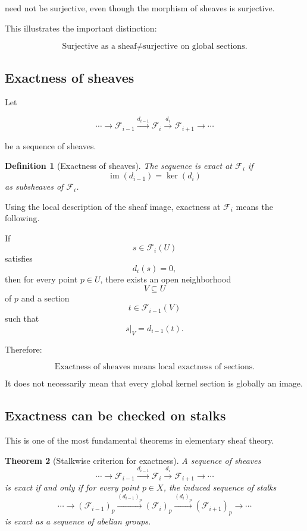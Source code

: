 \documentclass[12pt,a4paper]{article}
\DeclareMathOperator{\im}{im}
\theoremstyle{notespace}
\newtheorem{definition}{Definition}[subsection]
\newtheorem{theorem}[definition]{Theorem}
\begin{document}
need not be surjective, even though the morphism of sheaves is surjective.

This illustrates the important distinction:

\[
\boxed{
	\text{Surjective as a sheaf}
	\neq
	\text{surjective on global sections.}
}
\]

\subsection{Exactness of sheaves}
Let

\[
\cdots
\longrightarrow
\mathcal F_{i-1}
\xrightarrow{d_{i-1}}
\mathcal F_i
\xrightarrow{d_i}
\mathcal F_{i+1}
\longrightarrow
\cdots
\]

be a sequence of sheaves.

\begin{definition}[Exactness of sheaves]
	The sequence is exact at $\mathcal F_i$ if
	\[
	\im(d_{i-1})=\ker(d_i)
	\]
	as subsheaves of $\mathcal F_i$.
\end{definition}

Using the local description of the sheaf image, exactness at $\mathcal F_i$
means the following.

If
\[
s \in \mathcal F_i(U)
\]
satisfies
\[
d_i(s)=0,
\]
then for every point $p \in U$, there exists an open neighborhood
\[
V \subseteq U
\]
of $p$ and a section
\[
t \in \mathcal F_{i-1}(V)
\]
such that
\[
s|_V=d_{i-1}(t).
\]

Therefore:

\[
\boxed{
	\text{Exactness of sheaves means local exactness of sections.}
}
\]

It does not necessarily mean that every global kernel section is globally an
image.

\subsection{Exactness can be checked on stalks}
This is one of the most fundamental theorems in elementary sheaf theory.

\begin{theorem}[Stalkwise criterion for exactness]
	A sequence of sheaves
	\[
	\cdots
	\longrightarrow
	\mathcal F_{i-1}
	\xrightarrow{d_{i-1}}
	\mathcal F_i
	\xrightarrow{d_i}
	\mathcal F_{i+1}
	\longrightarrow
	\cdots
	\]
	is exact if and only if for every point $p \in X$, the induced sequence of
	stalks
	\[
	\cdots
	\longrightarrow
	(\mathcal F_{i-1})_p
	\xrightarrow{(d_{i-1})_p}
	(\mathcal F_i)_p
	\xrightarrow{(d_i)_p}
	(\mathcal F_{i+1})_p
	\longrightarrow
	\cdots
	\]
	is exact as a sequence of abelian groups.
\end{theorem}
\end{document}
